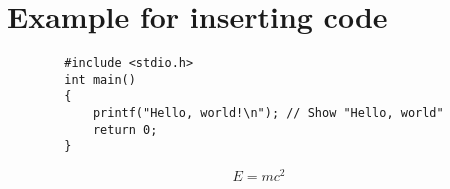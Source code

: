 \documentclass[a4paper]{article}
\begin{document}
	
	\section{Example for inserting code}
	
	\begin{verbatim}
		#include <stdio.h>
		int main() 
		{
		    printf("Hello, world!\n"); // Show "Hello, world"
		    return 0;
		}
	\end{verbatim}
	
	\begin{equation}
		E = mc^2
	\end{equation}
	
\end{document}
